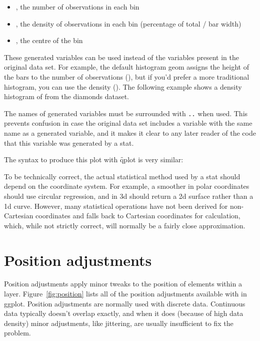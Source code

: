 \begin{itemize}
  \item {}, the number of observations in each bin
  \item {}, the density of observations in each bin (percentage of total / bar width)
  \item {}, the centre of the bin
\end{itemize}

These generated variables can be used instead of the variables present in the original data set.  For example, the default histogram geom assigns the height of the bars to the number of observations (), but if you'd prefer a more traditional histogram, you can use the density ().   The following example shows a density histogram of  from the diamonds dataset.

% 


The names of generated variables must be surrounded with {\tt ..} when used.  This prevents confusion in case the original data set includes a variable with the same name as a generated variable, and it makes it clear to any later reader of the code that this variable was generated by a stat.

The syntax to produce this plot with \f{qplot} is very similar:

% 


To be technically correct, the actual statistical method used by a stat should depend on the coordinate system.  For example, a smoother in polar coordinates should use circular regression, and in 3d should return a 2d surface rather than a 1d curve.  However, many statistical operations have not been derived for non-Cartesian coordinates and \ggplot falls back to Cartesian coordinates for calculation, which, while not strictly correct, will normally be a fairly close approximation.  

\section{Position adjustments}
\label{sec:position}

Position adjustments apply minor tweaks to the position of elements within a layer.  Figure~\ref{fig:position} lists all of the position adjustments available with in ggplot.  Position adjustments are normally used with discrete data.  Continuous data typically doesn't overlap exactly, and when it does (because of high data density) minor adjustments, like jittering, are usually insufficient to fix the problem.

